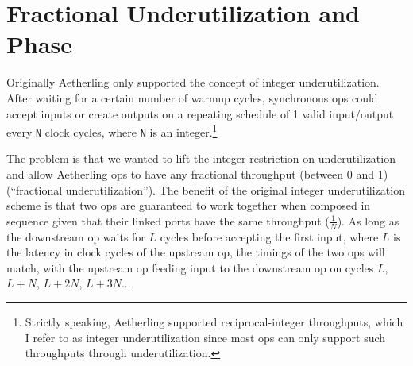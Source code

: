 \documentclass[12pt]{article}
\begin{document}
\section{Fractional Underutilization and Phase}

Originally Aetherling only supported the concept of integer
underutilization. After waiting for a certain number of warmup cycles,
synchronous ops could accept inputs or create outputs on a repeating
schedule of 1 valid input/output every \texttt{N} clock cycles, where
\texttt{N} is an integer.\footnote{Strictly speaking, Aetherling
  supported reciprocal-integer throughputs, which I refer to as
  integer underutilization since most ops can only support such
  throughputs through underutilization.}

The problem is that we wanted to lift the integer restriction on
underutilization and allow Aetherling ops to have any fractional
throughput (between 0 and 1) (``fractional underutilization''). The
benefit of the original integer underutilization scheme is that two
ops are guaranteed to work together when composed in sequence given
that their linked ports have the same throughput ($\frac{1}{N}$). As
long as the downstream op waits for $L$ cycles before accepting the
first input, where $L$ is the latency in clock cycles of the upstream
op, the timings of the two ops will match, with the upstream op
feeding input to the downstream op on cycles $L$, $L+N$, $L+2N$,
$L+3N$...
\end{document}
